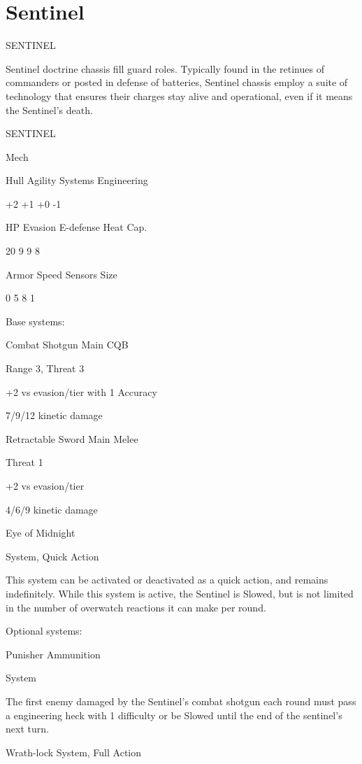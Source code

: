 \section{Sentinel}

                                              SENTINEL

Sentinel doctrine chassis fill guard roles. Typically found in the retinues of commanders or posted
in defense of batteries, Sentinel chassis employ a suite of technology that ensures their charges
stay alive and operational, even if it means the Sentinel’s death.


 SENTINEL

 Mech

 Hull       Agility     Systems       Engineering

 +2         +1           +0           -1

 HP         Evasion      E-defense    Heat Cap.

 20         9            9            8

 Armor      Speed       Sensors       Size

 0          5            8            1


Base systems:

Combat Shotgun
Main CQB

Range 3, Threat 3

+2 vs evasion/tier with 1 Accuracy

7/9/12 kinetic damage


Retractable Sword
Main Melee

Threat 1

+2 vs evasion/tier

4/6/9 kinetic damage


Eye of Midnight

System, Quick Action

This system can be activated or deactivated as a quick action, and remains indefinitely. While
this system is active, the Sentinel is Slowed, but is not limited in the number of overwatch
reactions it can make per round.


Optional systems:

Punisher Ammunition




System

The first enemy damaged by the Sentinel’s combat shotgun each round must pass a engineering
heck with 1 difficulty or be Slowed until the end of the sentinel’s next turn.


Wrath-lock
System, Full Action

